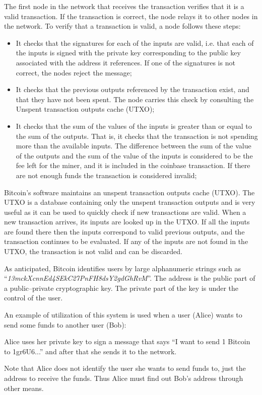\documentclass{article}
\begin{document}
The first node in the network that receives the transaction verifies that it is a valid transaction. If the transaction is correct, the node relays it to other nodes in the network. To verify that a transaction is valid, a node follows these steps:
\begin{itemize}
    \item It checks that the signatures for each of the inputs are valid, i.e. that each of the inputs is signed with the private key corresponding to the public key associated with the address it references. If one of the signatures is not correct, the nodes reject the message;
    \item It checks that the previous outputs referenced by the transaction exist, and that they have not been spent. The node carries this check by consulting the Unspent transaction outputs cache (UTXO);
    \item It checks that the sum of the values of the inputs is greater than or equal to the sum of the outputs. That is, it checks that the transaction is not spending more than the available inputs. The difference between the sum of the value of the outputs and the sum of the value of the inputs is considered to be the fee left for the miner, and it is included in the coinbase transaction. If there are not enough funds the transaction is considered invalid;
\end{itemize}
Bitcoin’s software maintains an unspent transaction outputs cache (UTXO).\newline
The UTXO is a database containing only the unspent transaction outputs and is very useful as it can be used to quickly check if new transactions are valid. When a new transaction arrives, its inputs are looked up in the UTXO. If all the inputs are found there then the inputs correspond to valid previous outputs, and the transaction continues to be evaluated. If any of the inputs are not found in the UTXO, the transaction is not valid and can be discarded.\par

\noindent As anticipated, Bitcoin identifies users by large alphanumeric strings such as “\textit{13mckXcnnEd4SE\allowbreak kC27PnFH8dsY2gdGhRvM}”. The address is the public part of a public–private cryptographic key. The private part of the key is under the control of the user.\par
\noindent An example of utilization of this system is used when a user (Alice) wants to send some funds to another user (Bob): \begin{displayquote} Alice uses her private key to sign a message that says “I want to send 1 Bitcoin to 1gr6U6...” and after that she sends it to the network.\end{displayquote} Note that Alice does not identify the user she wants to send funds to, just the address to receive the funds. Thus Alice must find out Bob’s address through other means.\par
\end{document}
